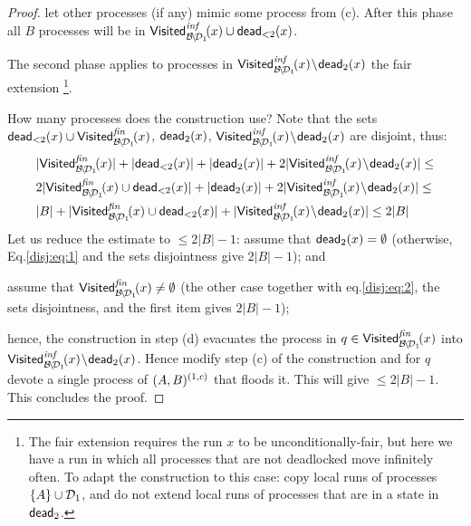 \begin{proof}
\-[e.] let other processes (if any) mimic some process from (c).
\il
After this phase all $B$ processes will be in 
$\mathsf{Visited}^{\textit{inf}}_{\mathcal{B} \!\setminus\! \mathcal{D}_1}\!(x) \cup {\sf dead}_{<2}(x)$. 

The second phase applies to processes in 
$\mathsf{Visited}^{\textit{inf}}_{\mathcal{B} \!\setminus\! \mathcal{D}_1}\!(x) \!\setminus\! {\sf dead}_2(x)$ the fair extension%
\footnote{The fair extension requires the run $x$ to be unconditionally-fair, 
          but here we have a run in which all processes that are not deadlocked
          move infinitely often.
          To adapt the construction to this case:
          copy local runs of processes $\{A\} \cup \mathcal{D}_1$,
          and do not extend local runs of processes that are in a
          state in ${\sf dead}_2$.}.


How many processes does the construction use? 
Note that the sets 
${\sf dead}_{<2}(x) \cup \mathsf{Visited}^{\textit{fin}}_{\mathcal{B} \!\setminus\! \mathcal{D}_1}\!(x)$, 
${\sf dead}_2(x)$, 
$\mathsf{Visited}^{\textit{inf}}_{\mathcal{B} \!\setminus\! \mathcal{D}_1}\!(x) \!\setminus\! {\sf dead}_2(x)$ 
are disjoint, thus:
\begin{align}
& | \visFin{\mB \smi \mD_1}{x} | + |\deadOne{x}| + |\deadTwo{x}| + 2| \visInf{\mB \smi \mD_1}{x} \smi \deadTwo{x} | \leq \label{disj:eq:1} \\
% 
& 2|\visFin{\mB \smi \mD_1}{x} \cup \deadOne{x}| + |\deadTwo{x}| + 2| \visInf{\mB \smi \mD_1}{x} \smi \deadTwo{x} | \leq \label{disj:eq:2} \\
% 
& |B| + |\visFin{\mB \smi \mD_1}{x} \cup \deadOne{x}| + | \visInf{\mB \smi \mD_1}{x} \smi \deadTwo{x} | \leq 2|B|  \nonumber
\end{align}
Let us reduce the estimate to $\leq 2|B|-1$:
\li
  \- assume that ${\sf dead}_2(x) = \emptyset$ 
     (otherwise, Eq.\ref{disj:eq:1} and the sets disjointness give $2|B|-1$);
     and

  \- assume that $ \mathsf{Visited}^{\textit{fin}}_{\mathcal{B} \!\setminus\! \mathcal{D}_1}\!(x) \neq \emptyset$ 
     (the other case together with eq.\ref{disj:eq:2}, 
      the sets disjointness, and the first item gives $2|B|-1$);

  \- hence, the construction in step (d) evacuates the process in 
     $q \in \mathsf{Visited}^{\textit{fin}}_{\mathcal{B} \!\setminus\! \mathcal{D}_1}\!(x)$ 
     into 
     $ \mathsf{Visited}^{\textit{inf}}_{\mathcal{B} \!\setminus\! \mathcal{D}_1}\!(x) \!\setminus\! {\sf dead}_2(x)$. 
     Hence modify step (c) of the construction 
     and for $q$ devote a single process of $(A,B)^{(1,c)}$ that floods it. 
     This will give $\leq 2|B|-1$.
\il
This concludes the proof.

\end{proof}



